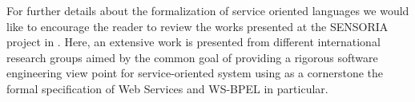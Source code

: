 For further details about the formalization of service oriented languages we would like to encourage the reader to review the works presented at the SENSORIA project in \cite{Wirsing2011bis}. Here, an extensive work is presented from different international research groups aimed by the common goal of providing a rigorous software engineering view point for service-oriented system using as a cornerstone the formal specification of Web Services and WS-BPEL in particular.%
